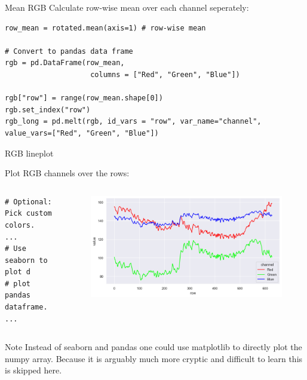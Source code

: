 \documentclass[compress%
,aspectratio=169%
]{beamer}
\begin{document}
\begin{frame}[fragile]{Mean RGB}
Calculate row-wise mean over each channel seperately:
\begin{lstlisting}
row_mean = rotated.mean(axis=1) # row-wise mean

# Convert to pandas data frame
rgb = pd.DataFrame(row_mean,
                    columns = ["Red", "Green", "Blue"])

rgb["row"] = range(row_mean.shape[0])
rgb.set_index("row")
rgb_long = pd.melt(rgb, id_vars = "row", var_name="channel", value_vars=["Red", "Green", "Blue"])

\end{lstlisting}
\end{frame}


\begin{frame}[fragile]{RGB lineplot}

Plot RGB channels over the rows:
\begin{columns}
\begin{lstlisting}
# Optional: Pick custom colors.
...
# Use seaborn to plot d
# plot pandas dataframe.
...
\end{lstlisting}
\begin{figure}
    \centering
    \includegraphics[width = 1\linewidth]{img/rgb_lines.png}
\end{figure}
\end{columns}
\begin{exampleblock} {Note}
\small
Instead of seaborn and pandas one could use matplotlib to directly plot the numpy array. Because it is arguably much more cryptic and difficult to learn this is skipped here.
\end{exampleblock}
\end{frame}
\end{document}
